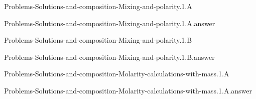 \documentclass[main.tex]{subfiles}
\newcommand\chapterlabel{}
\begin{document}
\renewcommand\chapterlabel{Ch-electrolytes}
\begin{question}[ID=\the\value{numA}]
{Problems-Solutions-and-composition-Mixing-and-polarity.1.A}
\end{question}
   \begin{Form}
   \TextField[multiline,backgroundcolor=gray!20,borderwidth=0,width=0.43\textwidth  ,height=115pt, name=\the\value{numA}]  { }\end{Form}
\begin{solution}
{Problems-Solutions-and-composition-Mixing-and-polarity.1.A.answer}
\hspace{0.1cm}
\end{solution}


\renewcommand\chapterlabel{Ch-electrolytes}
\begin{question}[ID=\the\value{numA}]
{Problems-Solutions-and-composition-Mixing-and-polarity.1.B}
\end{question}
   \begin{Form}
   \TextField[multiline,backgroundcolor=gray!20,borderwidth=0,width=0.43\textwidth  ,height=115pt, name=\the\value{numA}]  { }\end{Form}
\begin{solution}
{Problems-Solutions-and-composition-Mixing-and-polarity.1.B.answer}
\hspace{0.1cm}
\end{solution}


\renewcommand\chapterlabel{Ch-electrolytes}
\begin{question}[ID=\the\value{numA}]
{Problems-Solutions-and-composition-Molarity-calculations-with-mass.1.A}
\end{question}
   \begin{Form}
   \TextField[multiline,backgroundcolor=gray!20,borderwidth=0,width=0.43\textwidth  ,height=115pt, name=\the\value{numA}]  { }\end{Form}
\begin{solution}
{Problems-Solutions-and-composition-Molarity-calculations-with-mass.1.A.answer}
\hspace{0.1cm}
\end{solution}
\end{document}

